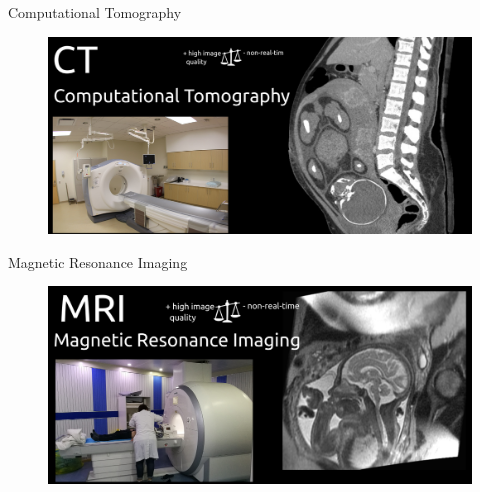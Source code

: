 {
\begin{frame}{Computational Tomography}
      \begin{figure}
        \centering
        \includegraphics[width=1.0\textwidth]{./figures/medical-imaging-in-pregnancy/ct/versions/drawing-v00.png}
      \end{figure}
\end{frame}
}


{
\begin{frame}{Magnetic Resonance Imaging}
      \begin{figure}
        \centering
        \includegraphics[width=1.0\textwidth]{./figures/medical-imaging-in-pregnancy/mri/versions/drawing-v00.png}
      \end{figure}
\end{frame}
}


